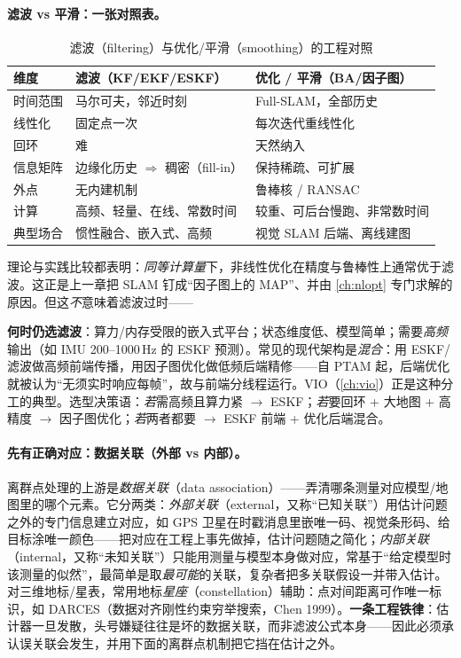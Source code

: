 \paragraph{滤波 vs 平滑：一张对照表。}
\begin{table}[H]\centering\small
\caption{滤波（filtering）与优化/平滑（smoothing）的工程对照}
\label{tab:filter-vs-opt}
\begin{tabular}{lll}
\toprule
维度 & 滤波（KF/EKF/ESKF） & 优化 / 平滑（BA/因子图） \\
\midrule
时间范围 & 马尔可夫，邻近时刻 & Full-SLAM，全部历史 \\
线性化 & 固定点一次 & 每次迭代重线性化 \\
回环 & 难 & 天然纳入 \\
信息矩阵 & 边缘化历史 $\Rightarrow$ 稠密（fill-in） & 保持稀疏、可扩展 \\
外点 & 无内建机制 & 鲁棒核 / RANSAC \\
计算 & 高频、轻量、在线、常数时间 & 较重、可后台慢跑、非常数时间 \\
典型场合 & 惯性融合、嵌入式、高频 & 视觉 SLAM 后端、离线建图 \\
\bottomrule
\end{tabular}
\end{table}

\noindent 理论与实践比较都表明：\emph{同等计算量}下，非线性优化在精度与鲁棒性上通常优于滤波\cite{gaoxiang2019slam14,carlone2026handbook}。这正是上一章把 SLAM 钉成“因子图上的 MAP”、并由 \cref{ch:nlopt} 专门求解的原因。但这\emph{不}意味着滤波过时——

\begin{insight}
\textbf{何时仍选滤波}：算力/内存受限的嵌入式平台；状态维度低、模型简单；需要\emph{高频}输出（如 IMU 200--1000\,Hz 的 ESKF 预测）。常见的现代架构是\emph{混合}：用 ESKF/滤波做高频前端传播，用因子图优化做低频后端精修——自 PTAM 起，后端优化就被认为“无须实时响应每帧”，故与前端分线程运行\cite{gaoxiang2019slam14}。VIO（\cref{ch:vio}）正是这种分工的典型。选型决策语：\emph{若}需高频且算力紧 $\to$ ESKF；\emph{若}要回环 + 大地图 + 高精度 $\to$ 因子图优化；\emph{若}两者都要 $\to$ ESKF 前端 + 优化后端混合。
\end{insight}

\paragraph{先有正确对应：数据关联（外部 vs 内部）。}
离群点处理的上游是\emph{数据关联}（data association）——弄清哪条测量对应模型/地图里的哪个元素\cite{barfoot2024state}。它分两类：\emph{外部关联}（external，又称“已知关联”）用估计问题之外的专门信息建立对应，如 GPS 卫星在时戳消息里嵌唯一码、视觉条形码、给目标涂唯一颜色——把对应在工程上事先做掉，估计问题随之简化；\emph{内部关联}（internal，又称“未知关联”）只能用测量与模型本身做对应，常基于“给定模型时该测量的似然”，最简单是取\emph{最可能}的关联，复杂者把多关联假设一并带入估计。对三维地标/星表，常用地标\emph{星座}（constellation）辅助：点对间距离可作唯一标识，如 DARCES（数据对齐刚性约束穷举搜索，Chen 1999\cite{chen1999ransac}）。\textbf{一条工程铁律}：估计器一旦发散，头号嫌疑往往是坏的数据关联，而非滤波公式本身——因此必须承认误关联会发生，并用下面的离群点机制把它挡在估计之外。

